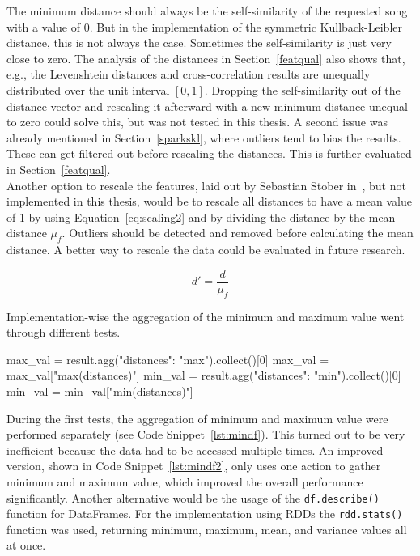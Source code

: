 \noindent The minimum distance should always be the self-similarity of the requested song with a value of 0. But in the implementation of the symmetric Kullback-Leibler distance, this is not always the case. Sometimes the self-similarity is just very close to zero. The analysis of the distances in Section~\ref{featqual} also shows that, e.g., the Levenshtein distances and cross-correlation results are unequally distributed over the unit interval $[0,1]$. Dropping the self-similarity out of the distance vector and rescaling it afterward with a new minimum distance unequal to zero could solve this, but was not tested in this thesis. A second issue was already mentioned in Section~\ref{sparkskl}, where outliers tend to bias the results. These can get filtered out before rescaling the distances. This is further evaluated in Section~\ref{featqual}.\\
Another option to rescale the features, laid out by Sebastian Stober in~\cite[pp. 543ff]{musicdata}, but not implemented in this thesis, would be to rescale all distances to have a mean value of 1 by using Equation~\eqref{eq:scaling2} and by dividing the distance by the mean distance $\mu_f$. Outliers should be detected and removed before calculating the mean distance. 
A better way to rescale the data could be evaluated in future research. 

\begin{equation} \label{eq:scaling2}
d' = \frac{d}{\mu_f}
\end{equation} 

\noindent Implementation-wise the aggregation of the minimum and maximum value went through different tests. 

\begin{pythonCode}[frame=single,label={lst:mindf},caption={Minimum and maximum aggregation separate},captionpos=b]
max_val = result.agg({"distances": "max"}).collect()[0]
max_val = max_val["max(distances)"]
min_val = result.agg({"distances": "min"}).collect()[0]
min_val = min_val["min(distances)"]
\end{pythonCode}

\noindent During the first tests, the aggregation of minimum and maximum value were performed separately (see Code Snippet~\ref{lst:mindf}). This turned out to be very inefficient because the data had to be accessed multiple times. 
\noindent An improved version, shown in Code Snippet~\ref{lst:mindf2}, only uses one action to gather minimum and maximum value, which improved the overall performance significantly. 
\noindent Another alternative would be the usage of the \lstinline{df.describe()} function for DataFrames. For the implementation using RDDs the \lstinline{rdd.stats()} function was used, returning minimum, maximum, mean, and variance values all at once. 

